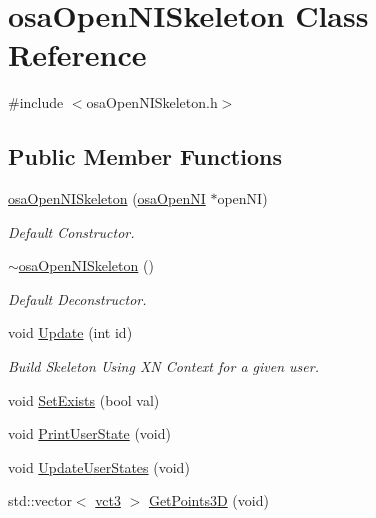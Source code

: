 \hypertarget{classosa_open_n_i_skeleton}{}\section{osa\+Open\+N\+I\+Skeleton Class Reference}
\label{classosa_open_n_i_skeleton}


{\ttfamily \#include $<$osa\+Open\+N\+I\+Skeleton.\+h$>$}

\subsection*{Public Member Functions}
\begin{DoxyCompactItemize}
\item 
\hyperlink{classosa_open_n_i_skeleton_a5c40f05bc1f79ba5fb4f1c422ba89c86}{osa\+Open\+N\+I\+Skeleton} (\hyperlink{classosa_open_n_i}{osa\+Open\+N\+I} $\ast$open\+N\+I)
\begin{DoxyCompactList}\small\item\em Default Constructor. \end{DoxyCompactList}\item 
\hyperlink{classosa_open_n_i_skeleton_a2050d470948165695fb24d6079762785}{$\sim$osa\+Open\+N\+I\+Skeleton} ()
\begin{DoxyCompactList}\small\item\em Default Deconstructor. \end{DoxyCompactList}\item 
void \hyperlink{classosa_open_n_i_skeleton_a9c4d7f37c334b5566960387d1c54f29d}{Update} (int id)
\begin{DoxyCompactList}\small\item\em Build Skeleton Using X\+N Context for a given user. \end{DoxyCompactList}\item 
void \hyperlink{classosa_open_n_i_skeleton_a5a77d5f4cf38aec50a0c95bb2c5451ec}{Set\+Exists} (bool val)
\item 
void \hyperlink{classosa_open_n_i_skeleton_a2ef6e75c2c3886ef865816d2e1fd21e1}{Print\+User\+State} (void)
\item 
void \hyperlink{classosa_open_n_i_skeleton_a0fdd5a406a0d9146fddaed2ecf53840f}{Update\+User\+States} (void)
\item 
std\+::vector$<$ \hyperlink{vct_fixed_size_vector_types_8h_a3af82acdbf4eeb73c551909240b106ea}{vct3} $>$ \hyperlink{classosa_open_n_i_skeleton_ad23115daaef6472d50c62cfb4a736408}{Get\+Points3\+D} (void)
\end{DoxyCompactItemize}
